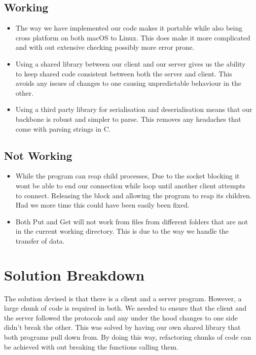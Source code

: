\documentclass{article}
\begin{document}
\subsection{Working}
\begin{itemize}
\item The way we have implemented our code makes it portable while also being cross platform on both macOS to Linux. This does make it more complicated and with out extensive checking possibly more error prone.
\item Using a shared library between our client and our server gives us the ability to keep shared code consistent between both the server and client. This avoids any issues of changes to one causing unpredictable behaviour in the other.
\item Using a third party library for serialisation and deserialisation means that our backbone is robust and simpler to parse. This removes any headaches that come with parsing strings in C.
\end{itemize}

\subsection{Not Working}
\begin{itemize}
    \item While the program can reap child processes, Due to the socket blocking it wont be able to end our connection while loop until another client attempts to connect. Releasing the block and allowing the program to reap its children. Had we more time this could have been easily been fixed.
    \item Both Put and Get will not work from files from different folders that are not in the current working directory. This is due to the way we handle the transfer of data.
\end{itemize}

\section{Solution Breakdown}
The solution devised is that there is a client and a server program. However, a large chunk of code is required in both. We needed to ensure that the client and the server followed the protocols and any under the hood changes to one side didn't break the other. This was solved by having our own shared library that both programs pull down from. By doing this way, refactoring chunks of code can be achieved with out breaking the functions calling them.\\
\end{document}
